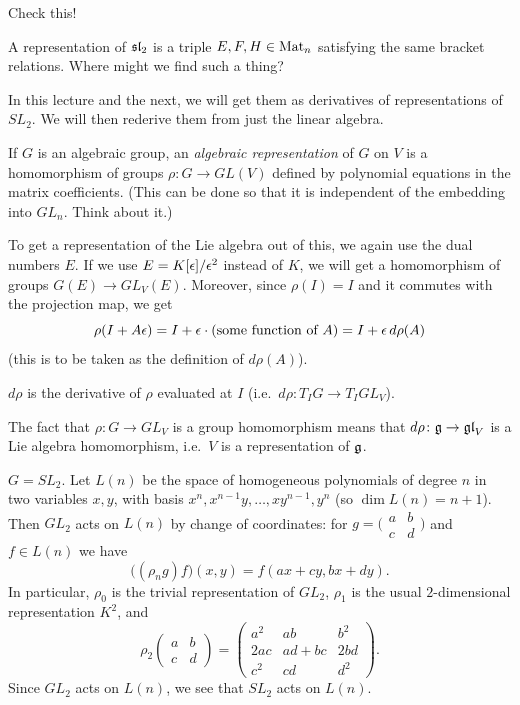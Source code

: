 \begin{exercise}
Check this!
\end{exercise}

A representation of $\sl_2$ is a triple $E, F, H \in \Mat_n$ satisfying the
same bracket relations. Where might we find such a thing?

In this lecture and the next, we will get them as derivatives of
representations of $SL_2$. We will then rederive them from just the linear
algebra.

\begin{definition}
If $G$ is an algebraic group, an \emph{algebraic representation} of $G$ on $V$
is a homomorphism of groups $\rho\colon G \to GL(V)$ defined by polynomial
equations in the matrix coefficients. (This can be done so that it is
independent of the embedding into $GL_n$. Think about it.)
\end{definition}

To get a representation of the Lie algebra out of this, we again use the dual
numbers $E$. If we use $E = K[\eps]/\eps^2$ instead of $K$, we will get a
homomorphism of groups $G(E) \to GL_V(E)$. Moreover, since $\rho(I) = I$ and
it commutes with the projection map, we get
\[
  \rho(I + A\eps) = I + \eps \cdot (\text{some function of } A) = I + \eps\, d\rho(A)
\]
(this is to be taken as the definition of $d\rho(A)$).

\begin{exercise}
$d\rho$ is the derivative of $\rho$ evaluated at $I$ (i.e.\
$d\rho\colon T_IG \to T_IGL_V$).
\end{exercise}

\begin{exercise}
The fact that $\rho\colon G \to GL_V$ is a group homomorphism means that
$d\rho\colon \g \to \gl_V$ is a Lie algebra homomorphism, i.e.\ $V$ is a
representation of $\g$.
\end{exercise}

\begin{example}
$G = SL_2$. Let $L(n)$ be the space of homogeneous polynomials of degree $n$
in two variables $x, y$, with basis $x^n, x^{n-1}y, \dots, xy^{n-1}, y^n$ (so
$\dim L(n) = n + 1$). Then $GL_2$ acts on $L(n)$ by change of coordinates: for
$g = \bigl(\begin{smallmatrix} a & b \\ c & d \end{smallmatrix}\bigr)$ and
$f \in L(n)$ we have
\[
  \bigl((\rho_n g) f\bigr)(x, y) = f(ax + cy, bx + dy).
\]
In particular, $\rho_0$ is the trivial representation of $GL_2$, $\rho_1$ is
the usual $2$-dimensional representation $K^2$, and
\[
  \rho_2 \begin{pmatrix} a & b \\ c & d \end{pmatrix}
  = \begin{pmatrix} a^2 & ab & b^2 \\ 2ac & ad + bc & 2bd \\ c^2 & cd & d^2 \end{pmatrix}.
\]
Since $GL_2$ acts on $L(n)$, we see that $SL_2$ acts on $L(n)$.
\end{example}

